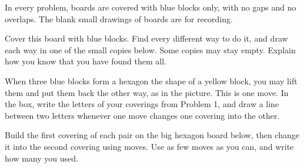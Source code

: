 \documentclass[12pt]{article}
\begin{document}
In every problem, boards are covered with blue blocks only, with no gaps and no overlaps. The blank small drawings of boards are for recording.

\bigskip
{} Cover this board with blue blocks. Find every different way to do it, and draw each way in one of the small copies below. Some copies may stay empty. Explain how you know that you have found them all.

\vspace{0.3in}

\vspace{0.45in}
\centering
{}\hspace{0.35in}\hspace{0.35in}

\vspace{0.3in}
\hspace{0.35in}\hspace{0.35in}

\vspace{0.3in}
\hspace{0.35in}\hspace{0.35in}

\raggedright
\newpage

 When three blue blocks form a hexagon the shape of a yellow block, you may lift them and put them back the other way, as in the picture. This is one move. In the box, write the letters of your coverings from Problem 1, and draw a line between two letters whenever one move changes one covering into the other.

\vspace{0.3in}
\centering
{}\hspace{0.25in}\raisebox{0.55in}{\lrarrow}\hspace{0.25in}

\vspace{0.35in}
\framebox[\linewidth]{\rule{0pt}{4.6in}}

\raggedright
\newpage

 Build the first covering of each pair on the big hexagon board below, then change it into the second covering using moves. Use as few moves as you can, and write how many you used.

\vspace{0.35in}
\end{document}
